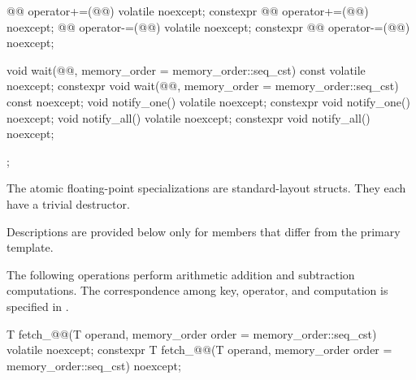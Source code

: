 \begin{codeblock}
{{    @@ operator+=(@@) volatile noexcept;
    constexpr @@ operator+=(@@) noexcept;
    @@ operator-=(@@) volatile noexcept;
    constexpr @@ operator-=(@@) noexcept;

    void wait(@@, memory_order = memory_order::seq_cst) const volatile noexcept;
    constexpr void wait(@@,
                        memory_order = memory_order::seq_cst) const noexcept;
    void notify_one() volatile noexcept;
    constexpr void notify_one() noexcept;
    void notify_all() volatile noexcept;
    constexpr void notify_all() noexcept;
  };
}
\end{codeblock}

\pnum
The atomic floating-point specializations
are standard-layout structs.
They each have
a trivial destructor.

\pnum
Descriptions are provided below only for members that differ from the primary template.

\pnum
The following operations perform arithmetic addition and subtraction computations.
The correspondence among key, operator, and computation is specified
in .

%
%
%
%
%
%
\begin{itemdecl}
T fetch_@@(T operand, memory_order order = memory_order::seq_cst) volatile noexcept;
constexpr T fetch_@@(T operand, memory_order order = memory_order::seq_cst) noexcept;
\end{itemdecl}

